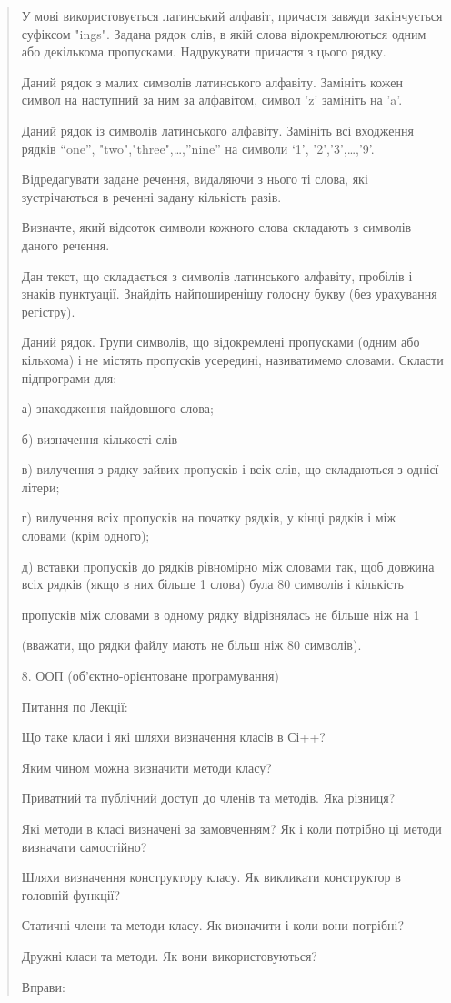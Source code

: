\documentclass[]{article}
\begin{document}
\begin{quote}
У мові використовується латинський алфавіт, причастя завжди закінчується
суфіксом "ings". Задана рядок слів, в якій слова відокремлюються одним
або декількома пропусками. Надрукувати причастя з цього рядку.

Даний рядок з малих символів латинського алфавіту. Замініть кожен символ
на наступний за ним за алфавітом, символ 'z' замініть на 'a'.

Даний рядок із символів латинського алфавіту. Замініть всі входження
рядків ``one'', "two","three",\ldots{},''nine'' на символи `1',
'2','3',\ldots{},'9'.

Відредагувати задане речення, видаляючи з нього ті слова, які
зустрічаються в реченні задану кількість разів.

Визначте, який відсоток символи кожного слова складають з символів
даного речення.\protect\hypertarget{_Hlk65949571}{}{}

Дан текст, що складається з символів латинського алфавіту, пробілів і
знаків пунктуації. Знайдіть найпоширенішу голосну букву (без урахування
регістру).

Даний рядок. Групи символів, що відокремлені пропусками (одним або
кількома) і не містять пропусків усередині, називатимемо словами.
Скласти підпрограми для:

а) знаходження найдовшого слова;

б) визначення кількості слів

в) вилучення з рядку зайвих пропусків і всіх слів, що складаються з
однієї літери;

г) вилучення всіх пропусків на початку рядків, у кінці рядків і між
словами (крім одного);

д) вставки пропусків до рядків рівномірно між словами так, щоб довжина
всіх рядків (якщо в них більше 1 слова) була 80 символів і кількість

пропусків між словами в одному рядку відрізнялась не більше ніж на 1

(вважати, що рядки файлу мають не більш ніж 80 символів).

\protect\hypertarget{_Hlk48906736}{}{}

8. ООП (об'єктно-орієнтоване програмування)

\protect\hypertarget{_Hlk57988688}{}{}

Питання по Лекції:

Що таке класи і які шляхи визначення класів в Сі++?

Яким чином можна визначити методи класу?

Приватний та публічний доступ до членів та методів. Яка різниця?

Які методи в класі визначені за замовченням? Як і коли потрібно ці
методи визначати самостійно?

Шляхи визначення конструктору класу. Як викликати конструктор в головній
функції?

Статичні члени та методи класу. Як визначити і коли вони потрібні?

Дружні класи та методи. Як вони використовуються?

Вправи:
\end{quote}
\end{document}
